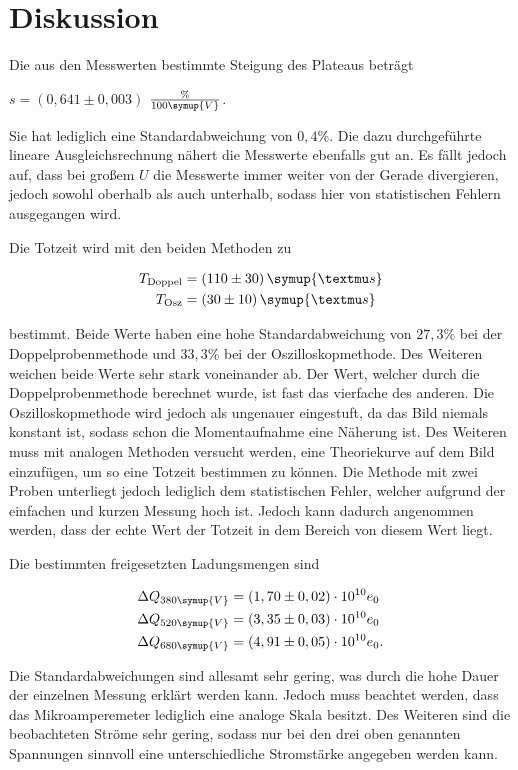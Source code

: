 \section{Diskussion}
\label{sec:Diskussion}

Die aus den Messwerten bestimmte Steigung des Plateaus beträgt

\begin{center}
    $s = (0,641 \pm 0,003)$ $\frac{\%}{100\symup{V}}$.
\end{center}

Sie hat lediglich eine Standardabweichung von $0,4 \%$. Die dazu durchgeführte lineare Ausgleichsrechnung
nähert die Messwerte ebenfalls gut an. Es fällt jedoch auf, dass bei großem $U$ die Messwerte immer weiter von der Gerade divergieren,
jedoch sowohl oberhalb als auch unterhalb, sodass hier von statistischen Fehlern ausgegangen wird.

Die Totzeit wird mit den beiden Methoden zu 

\begin{align*}
    T_\text{Doppel} &= (110 \pm 30) \, \symup{µs}\\
    T_\text{Osz} &= (30 \pm 10) \, \symup{µs}
\end{align*}

bestimmt. Beide Werte haben eine hohe Standardabweichung von $27,3 \%$ bei der Doppelprobenmethode und $33,3 \%$ bei der Oszilloskopmethode.
Des Weiteren weichen beide Werte sehr stark voneinander ab. Der Wert, welcher durch die Doppelprobenmethode berechnet wurde, ist fast das vierfache des anderen.
Die Oszilloskopmethode wird jedoch als ungenauer eingestuft, da das Bild niemals konstant ist, sodass schon die Momentaufnahme eine Näherung ist.
Des Weiteren muss mit analogen Methoden versucht werden, eine Theoriekurve auf dem Bild einzufügen, um so eine Totzeit bestimmen zu können.
Die Methode mit zwei Proben unterliegt jedoch lediglich dem statistischen Fehler, welcher aufgrund der einfachen und kurzen Messung hoch ist.
Jedoch kann dadurch angenommen werden, dass der echte Wert der Totzeit in dem Bereich von diesem Wert liegt.

Die bestimmten freigesetzten Ladungsmengen sind

\begin{align*}
    \Delta Q_{380 \symup{V}} &= (1,70 \pm 0,02) \cdot 10^{10} e_0\\
    \Delta Q_{520 \symup{V}} &= (3,35 \pm 0,03) \cdot 10^{10} e_0\\
    \Delta Q_{680 \symup{V}} &= (4,91 \pm 0,05) \cdot 10^{10} e_0.
\end{align*}

Die Standardabweichungen sind allesamt sehr gering, was durch die hohe Dauer der einzelnen Messung erklärt werden kann.
Jedoch muss beachtet werden, dass das Mikroamperemeter lediglich eine analoge Skala besitzt.
Des Weiteren sind die beobachteten Ströme sehr gering, sodass nur bei den drei oben genannten Spannungen sinnvoll eine unterschiedliche Stromstärke angegeben werden kann.
